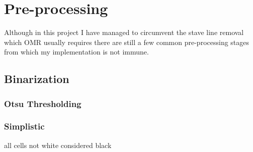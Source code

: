 \section{Pre-processing}

Although in this project I have managed to circumvent the stave line removal which OMR usually requires  there are still a few common pre-processing stages from which my implementation is not immune.

\subsection{Binarization}
\label{sec:binarization}

\subsubsection{Otsu Thresholding}

\subsubsection{Simplistic}

all cells not white considered black

